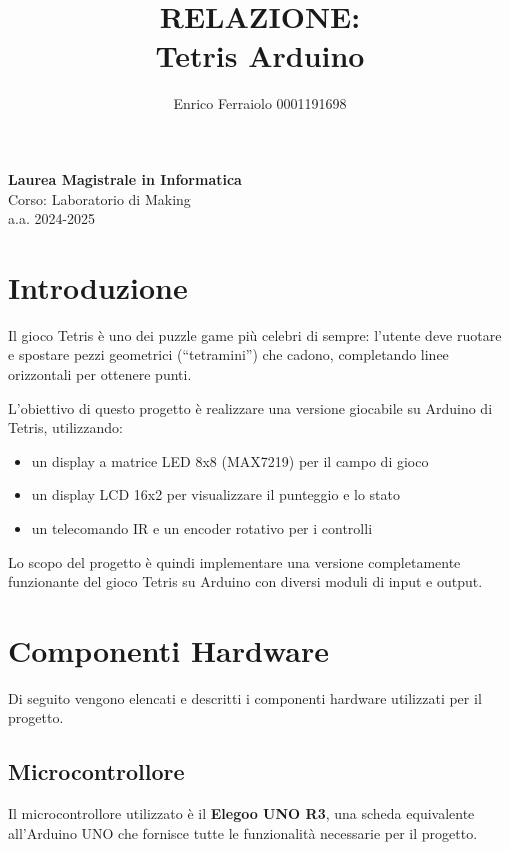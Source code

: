 \documentclass[a4paper, 12pt]{article}
\title{\textbf{RELAZIONE: \\ Tetris Arduino}}
\author{Enrico Ferraiolo 0001191698}
\date{}
\begin{document}
\maketitle

\begin{center}
    \textbf{Laurea Magistrale in Informatica}\\
    \vspace{0.3cm}
    Corso: Laboratorio di Making\\
    a.a. 2024-2025
    \vspace{2cm}
\end{center}

\newpage

\tableofcontents
\newpage

\section{Introduzione}
\label{sec:introduzione}
Il gioco Tetris è uno dei puzzle game più celebri di sempre: l'utente deve ruotare e spostare pezzi geometrici (``tetramini'') che cadono,
completando linee orizzontali per ottenere punti.

L'obiettivo di questo progetto è realizzare una versione giocabile su Arduino di Tetris, utilizzando:
\begin{itemize}
    \item un display a matrice LED 8x8 (MAX7219) per il campo di gioco
    \item un display LCD 16x2 per visualizzare il punteggio e lo stato
    \item un telecomando IR e un encoder rotativo per i controlli
\end{itemize}

Lo scopo del progetto è quindi implementare una versione completamente funzionante del gioco Tetris su Arduino con diversi moduli di input e output.

\section{Componenti Hardware}
\label{sec:componenti-hardware}
Di seguito vengono elencati e descritti i componenti hardware utilizzati per il progetto.

\subsection{Microcontrollore}
\label{subsec:microcontrollore}
Il microcontrollore utilizzato è il \textbf{Elegoo UNO R3}, una scheda equivalente all'Arduino UNO che fornisce tutte le funzionalità necessarie per il progetto.
\end{document}
